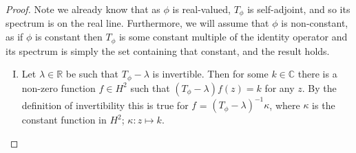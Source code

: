 \documentclass[../main.tex]{subfiles}
\begin{document}
\begin{proof}
Note we already know that as $\phi$ is real-valued, $T_\phi$ is self-adjoint, and so its spectrum is on the real line. %
Furthermore, we will assume that $\phi$ is non-constant, as if $\phi$ is constant then $T_\phi$ is some constant multiple of the identity operator
and its spectrum is simply the set containing that constant, and the result holds.
\begin{enumerate}[I.]
\item Let $\lambda \in \mathbb{R}$ be such that $T_\phi - \lambda$ is invertible. Then for some $k \in \mathbb{C}$ there is a non-zero function $f \in H^2$ such that $(T_\phi - \lambda)f(z) = k$ for any $z$. By the definition of invertibility this is true for $f$ = $(T_\phi - \lambda)^{-1}\kappa$, where
$\kappa$ is the constant function in $H^2$; $\kappa : z \mapsto k$.


\end{enumerate}
\end{proof}
\end{document}
